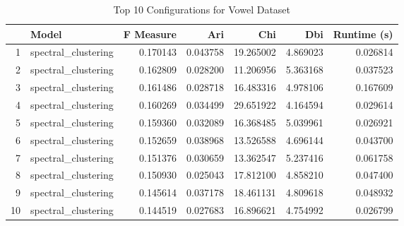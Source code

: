 \begin{table*}[ht!]
\caption{Top 10 Configurations for Vowel Dataset}
\label{tab:top_models_vowel}
\begin{tabular}{rlrrrrr}
 & Model & F Measure & Ari & Chi & Dbi & Runtime (s) \\\midrule

1 & spectral\_clustering & 0.170143 & 0.043758 & 19.265002 & 4.869023 & 0.026814 \\
2 & spectral\_clustering & 0.162809 & 0.028200 & 11.206956 & 5.363168 & 0.037523 \\
3 & spectral\_clustering & 0.161486 & 0.028718 & 16.483316 & 4.978106 & 0.167609 \\
4 & spectral\_clustering & 0.160269 & 0.034499 & 29.651922 & 4.164594 & 0.029614 \\
5 & spectral\_clustering & 0.159360 & 0.032089 & 16.368485 & 5.039961 & 0.026921 \\
6 & spectral\_clustering & 0.152659 & 0.038968 & 13.526588 & 4.696144 & 0.043700 \\
7 & spectral\_clustering & 0.151376 & 0.030659 & 13.362547 & 5.237416 & 0.061758 \\
8 & spectral\_clustering & 0.150930 & 0.025043 & 17.812100 & 4.858210 & 0.047400 \\
9 & spectral\_clustering & 0.145614 & 0.037178 & 18.461131 & 4.809618 & 0.048932 \\
10 & spectral\_clustering & 0.144519 & 0.027683 & 16.896621 & 4.754992 & 0.026799 \\
\end{tabular}
\end{table*}
